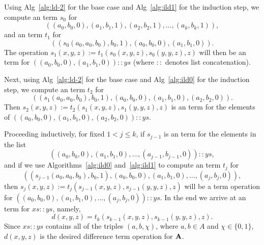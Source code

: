 Using Alg~\ref{alg:ld-2} for the base case 
and Alg~\ref{alg:ild1}
for the induction step,
we compute an \ld term $s_0$ for
\begin{equation*}
((a_0, b_0, 0), (a_1, b_1, 1), (a_2, b_2, 1), \dots, (a_k, b_k, 1)),  
\end{equation*}
and an \ld term $t_1$ for
\begin{equation*}
((s_0(a_0, a_0, b_0), b_0, 1), (a_0, b_0, 0),(a_1, b_1, 0)). 
\end{equation*}
The operation $s_1(x,y,z) := t_1(s_0(x,y,z), s_0(y,y,z), z)$ will then be
an \ld term for
$((a_0, b_0, 0), (a_1, b_1, 0)) :: ys$  (where $::$ denotes
list concatenation).

Next, using Alg~\ref{alg:ld-2} for the base case
and Alg~\ref{alg:ild0} for the induction step,
we compute an \ld term $t_2$ for
\begin{equation*}
((s_1(a_0, a_0, b_0), b_0, 1), (a_0, b_0, 0),(a_1, b_1, 0),(a_2, b_2, 0)). 
\end{equation*}
Then $s_2(x,y,z) := t_2(s_1(x,y,z), s_1(y,y,z), z)$ is an \ld term
for the elements of
$((a_0, b_0, 0), (a_1, b_1, 0), (a_2, b_2, 0)) :: ys$.

Proceeding inductively, for fixed $1<j\leq k$, 
if $s_{j-1}$ is an \ld term 
for the elements in the list
\begin{equation*}
((a_0, b_0, 0), (a_1, b_1, 0), \dots, (a_{j-1}, b_{j-1}, 0)) :: ys,
\end{equation*}
and if we use Algorithms~\ref{alg:ild0} and~\ref{alg:ild1}
to compute an \ld term $t_j$ for
\begin{equation*}
((s_{j-1}(a_0, a_0, b_0), b_0, 1), (a_0, b_0, 0),(a_1, b_1, 0),\dots, 
(a_j, b_j, 0)), 
\end{equation*}
then $s_j(x,y,z) := t_j(s_{j-1}(x,y,z), s_{j-1}(y,y,z), z)$ will be a 
\ld term operation for 
$((a_0, b_0, 0), (a_1, b_1, 0), \dots, (a_j, b_j, 0)) :: ys$.
In the end we arrive at an \ld term for $xs :: ys$, namely,
\begin{equation*}
d(x,y,z) = t_k(s_{k-1}(x,y,z), s_{k-1}(y,y,z), z).
\end{equation*}
Since $xs :: ys$ contains all of the triples $(a,b,\chi)$, where
$a, b \in A$ and $\chi \in \{0,1\}$, 
$d(x,y,z)$ is the desired difference term operation for $\mathbf{A}$.







